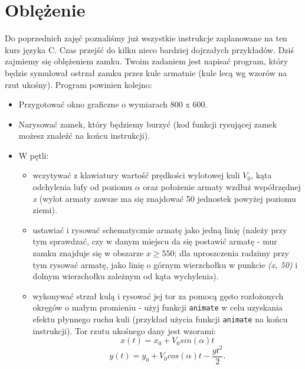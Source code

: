 \documentclass{instrukcja}
\begin{document}
\author{B. Górecki}
\materialtitle


\section{Oblężenie}
Do poprzednich zajęć poznaliśmy już wszystkie instrukcje zaplanowane na ten kurs języka C. Czas przejść do kilku nieco bardziej dojrzałych przykładów. Dziś zajmiemy się oblężeniem zamku. Twoim zadaniem jest napisać program, który będzie symulował ostrzał zamku przez kule armatnie (kule lecą wg wzorów na rzut ukośny). Program powinien kolejno:
\begin{itemize}
\item Przygotować okno graficzne o wymiarach 800 x 600.
\item Narysować zamek, który będziemy burzyć (kod funkcji rysującej zamek możesz znaleźć na końcu instrukcji).
\item W pętli:
\begin{itemize}
\item wczytywać z klawiatury wartość prędkości wylotowej kuli \begin{math} V_0 \end{math}, kąta odchylenia lufy od poziomu \begin{math} \alpha \end{math} oraz położenie armaty wzdłuż współrzędnej {\it x} (wylot armaty zawsze ma się znajdować 50 jednostek powyżej poziomu ziemi).
\item ustawiać i rysować schematycznie armatę jako jedną linię (należy przy tym sprawdzać, czy w danym miejscu da się postawić armatę - mur zamku znajduje się w obszarze \begin{math} x \geq 550 \end{math}; dla uproszczenia radzimy przy tym rysować armatę, jako linię o górnym wierzchołku w punkcie {\it (x, 50)} i dolnym wierzchołku zależnym od kąta wychylenia).
\item wykonywać strzał kulą i rysować jej tor za pomocą gęsto rozłożonych okręgów o małym promieniu - użyj funkcji {\tt animate} w celu uzyskania efektu płynnego ruchu kuli (przykład użycia funkcji {\tt animate} na końcu instrukcji). Tor rzutu ukośnego dany jest wzorami:
\begin{equation}
x(t) = x_0 + V_0 sin(\alpha)t
\end{equation}
\begin{equation}
y(t) = y_0 + V_0 cos(\alpha)t - \frac{gt^2}{2}.

\end{equation}
\end{itemize}
\end{itemize}
\end{document}
